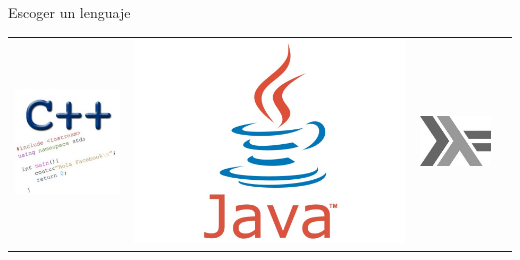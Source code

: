 \begin{frame}{Escoger un lenguaje}
  \begin{center}
    \begin{tabular}{c c c c}
      \includegraphics[scale=0.1]{img/cpp} & \pause
      \includegraphics[scale=0.15]{img/java} & \pause
      \includegraphics[scale=0.15]{img/haskell} & \pause

\end{tabular}
\end{center}
\end{frame}
